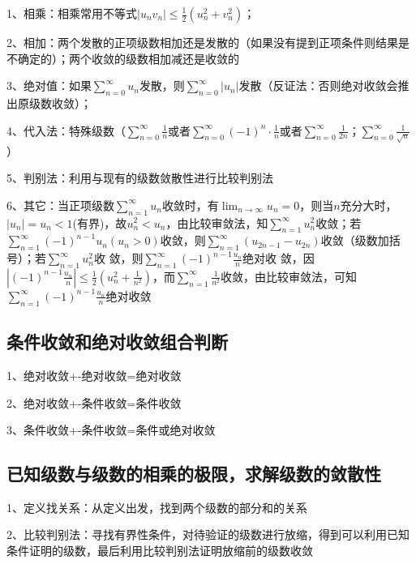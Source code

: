 1、相乘：相乘常用不等式$|u_nv_n| \le \frac{1}{2}(u_n^2+v_n^2)$；

2、相加：两个发散的正项级数相加还是发散的（如果没有提到正项条件则结果是不确定的）；两个收敛的级数相加减还是收敛的

3、绝对值：如果$\sum_{n=0}^{\infty}u_n$发散，则$\sum_{n=0}^{\infty}|u_n|$发散（反证法：否则绝对收敛会推出原级数收敛）；

4、代入法：特殊级数（$\sum_{n=0}^{\infty}\frac{1}{n}$或者$\sum_{n=0}^{\infty}(-1)^n·\frac{1}{n}$或者$\sum_{n=0}^{\infty}\frac{1}{2n}$；$\sum_{n=0}^{\infty}\frac{1}{\sqrt n}$）

5、判别法：利用与现有的级数敛散性进行比较判别法

6、其它：当正项级数$\sum_{n=1}^{\infty} u_{n}$收敛时，有$\lim_{n \rightarrow \infty} u_{n}=0$，则当$n$充分大时，$\left|u_{n}\right|=u_{n}<1$(有界)，故$u_{n}^{2}<u_{n}$，由比较审敛法，知$\sum_{n=1}^{\infty} u_{n}^{2}$收敛；若$\sum_{n=1}^{\infty}(-1)^{n-1} u_{n}\left(u_{n}>0\right)$收敛，则$\sum_{n=1}^{\infty}\left(u_{2 n-1}-u_{2 n}\right)$收敛（级数加括号）；若$\sum_{n=1}^{\infty} u_{n}^{2}$收 敛，则$\sum_{n=1}^{\infty}(-1)^{n-1} \frac{u_{n}}{n}$绝对收 敛，因$\left|(-1)^{n-1} \frac{u_{n}}{n}\right| \leqslant \frac{1}{2}\left(u_{n}^{2}+\frac{1}{n^{2}}\right)$，而$\sum_{n=1}^{\infty} \frac{1}{n^{2}}$收敛，由比较审敛法，可知$\sum_{n=1}^{\infty}(-1)^{n-1} \frac{u_{n}}{n}$绝对收敛



\subsection{条件收敛和绝对收敛组合判断}

1、绝对收敛+-绝对收敛=绝对收敛

2、绝对收敛+-条件收敛=条件收敛

3、条件收敛+-条件收敛=条件或绝对收敛



\subsection{已知级数与级数的相乘的极限，求解级数的敛散性}

1、定义找关系：从定义出发，找到两个级数的部分和的关系

2、比较判别法：寻找有界性条件，对待验证的级数进行放缩，得到可以利用已知条件证明的级数，最后利用比较判别法证明放缩前的级数收敛

